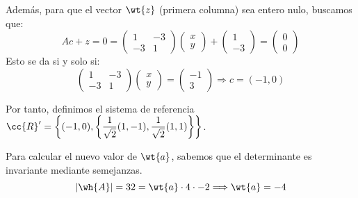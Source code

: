 \begin{ejercicio}
\begin{enumerate}
        Además, para que el vector $\wt{z}$ (primera columna) sea entero nulo, buscamos que:
        \begin{equation*}
            Ac + z = 0
            =  \left(\begin{array}{cc}
                1 & -3 \\
                -3 & 1
            \end{array}\right)\left(\begin{array}{c}
                x\\y
            \end{array}\right) + \left(\begin{array}{c}
                1 \\ -3
            \end{array}\right) = \left(\begin{array}{c}
                0\\0
            \end{array}\right)
        \end{equation*}
        Esto se da si y solo si:
        \begin{equation*}
            \left(\begin{array}{cc}
                1 & -3 \\
                -3 & 1
            \end{array}\right)\left(\begin{array}{c}
                x\\y
            \end{array}\right) = \left(\begin{array}{c}
                -1 \\ 3
            \end{array}\right) \Longrightarrow c=(-1,0)
        \end{equation*}
    
        Por tanto, definimos el sistema de referencia $\cc{R}'=\left\{(-1, 0), \left\{\dfrac{1}{\sqrt{2}}(1,-1), \dfrac{1}{\sqrt{2}}(1,1)\right\}\right\}$.
    
        Para calcular el nuevo valor de $\wt{a}$, sabemos que el determinante es invariante mediante semejanzas.
        \begin{equation*}
            |\wh{A}|=32= \wt{a}\cdot 4\cdot -2\Longrightarrow \wt{a}=-4
        \end{equation*}
        

\end{enumerate}
\end{ejercicio}
